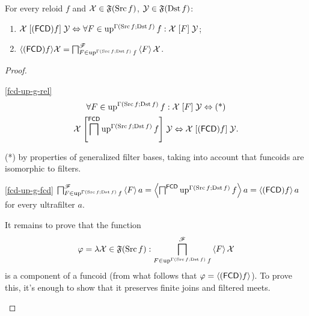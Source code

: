 \begin{thm}
For every reloid $f$ and $\mathcal{X}\in\mathfrak{F}(\operatorname{Src} f)$, $\mathcal{Y}\in\mathfrak{F}(\operatorname{Dst} f)$:
\begin{enumerate}
\item \label{fcd-up-g-rel}$\mathcal{X}\mathrel{[(\mathsf{FCD}) f]}\mathcal{Y}\Leftrightarrow\forall F\in\operatorname{up}^{\Gamma(\operatorname{Src} f;\operatorname{Dst} f)}f:\mathcal{X}\mathrel{\left[F\right]}\mathcal{Y}$;
\item \label{fcd-up-g-fcd}$\langle(\mathsf{FCD}) f\rangle\mathcal{X}=\bigsqcap_{F\in\operatorname{up}^{\Gamma(\operatorname{Src} f;\operatorname{Dst} f)}f}^{\mathscr{F}}\left\langle F\right\rangle\mathcal{X}$.
\end{enumerate}
\end{thm}
\begin{proof}
~
\begin{widedisorder}
\item [{\ref{fcd-up-g-rel}}] ~
\begin{multline*}
\forall F\in\operatorname{up}^{\Gamma(\operatorname{Src} f;\operatorname{Dst} f)}f:\mathcal{X}\mathrel{\left[F\right]}\mathcal{Y}\Leftrightarrow\text{(*)}\\
\mathcal{X}\mathrel{\left[\bigsqcap^{\mathsf{FCD}}\operatorname{up}^{\Gamma(\operatorname{Src} f;\operatorname{Dst} f)}f\right]}\mathcal{Y}\Leftrightarrow\mathcal{X}\mathrel{\left[(\mathsf{FCD}) f\right]}\mathcal{Y}.
\end{multline*}



({*}) by properties of generalized filter bases, taking into account
that funcoids are isomorphic to filters.

\item [{\ref{fcd-up-g-fcd}}] $\bigsqcap_{F\in\operatorname{up}^{\Gamma(\operatorname{Src} f;\operatorname{Dst} f)}f}^{\mathscr{F}}\left\langle F\right\rangle a=\left\langle \bigsqcap^{\mathsf{FCD}}\operatorname{up}^{\Gamma(\operatorname{Src} f;\operatorname{Dst} f)}f\right\rangle a=\left\langle (\mathsf{FCD}) f\right\rangle a$
for every ultrafilter $a$.


It remains to prove that the function 
\[
\varphi=\lambda\mathcal{X}\in\mathfrak{F}(\operatorname{Src} f):\bigsqcap_{F\in\operatorname{up}^{\Gamma(\operatorname{Src} f;\operatorname{Dst} f)}f}^{\mathscr{F}}\left\langle F\right\rangle\mathcal{X}
\]
is a component of a funcoid (from what follows that $\varphi=\left\langle (\mathsf{FCD}) f\right\rangle$).
To prove this, it's enough to show that it preserves finite joins
and filtered meets.



\end{widedisorder}
\end{proof}
